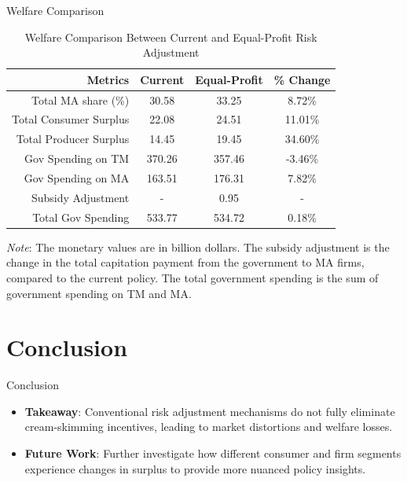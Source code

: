 \documentclass[professionalfonts, aspectratio=169]{beamer}
\begin{document}
\begin{frame}{Welfare Comparison}
  \begin{table}[ht]
    \small
    \centering
    \caption{Welfare Comparison Between Current and Equal-Profit Risk Adjustment}
    \label{tab:counterfactual}
    \begin{threeparttable}
      \renewcommand{\arraystretch}{1.2}
      \begin{tabular}{@{}rccc@{}}
        \toprule
        \textbf{Metrics} & \textbf{Current} & \textbf{Equal-Profit} & \textbf{\% Change} \\ \midrule
        Total MA share (\%) & 30.58 & 33.25 & 8.72\% \\
        Total Consumer Surplus & 22.08 & 24.51 & 11.01\% \\
        Total Producer Surplus & 14.45 & 19.45 & 34.60\% \\
        Gov Spending on TM & 370.26 & 357.46 & -3.46\% \\
        Gov Spending on MA & 163.51 & 176.31 & 7.82\% \\
        Subsidy Adjustment & - & 0.95 & - \\
        Total Gov Spending & 533.77 & 534.72 & 0.18\% \\
        \bottomrule
      \end{tabular}
      \begin{tablenotes}
        \footnotesize
        \textit{Note}: The monetary values are in billion dollars. The subsidy adjustment is the change in the total capitation payment from the government to MA firms, compared to the current policy. The total government spending is the sum of government spending on TM and MA.
      \end{tablenotes}
    \end{threeparttable}
  \end{table}
\end{frame}

\section{Conclusion}
\begin{frame}{Conclusion}
  \begin{itemize}
    \item \textbf{Takeaway}: Conventional risk adjustment mechanisms do not fully eliminate cream-skimming incentives, leading to market distortions and welfare losses.
    \item \textbf{Future Work}: Further investigate how different consumer and firm segments experience changes in surplus to provide more nuanced policy insights.
  \end{itemize}
\end{frame}
\end{document}
